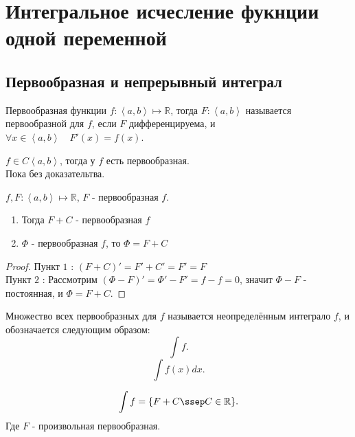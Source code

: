 \documentclass[11pt, oneside]{article}   	%
\begin{document}
\section{Интегральное исчесление фукнции одной переменной}
    \subsection{Первообразная и непрерывный интеграл}
         \begin{definition}
             Первообразная функции $f : \left<a, b\right> \mapsto \mathbb{R}$, тогда $F : \left<a, b\right> $ называется первообразной для $f$, если $F$ дифференцируема, и $\forall{x\in \left<a, b\right>}\quad F'(x) = f(x)$.
         \end{definition}
         \begin{theorem}
             $f\in C\left<a, b\right>$, тогда у $f$ есть первообразная.\\
             Пока без доказательтва.
         \end{theorem}
         \begin{theorem}
             $f,F: \left<a, b\right> \mapsto \mathbb{R}$, $F$ -  первообразная $f$.\\
             \begin{enumerate}
                 \item Тогда $F+C$ - первообразная $f$ 
                 \item $\Phi$ -  первообразная $f$, то $\Phi = F + C$
             \end{enumerate}
             \begin{proof}
                 Пункт $1$ : $(F+C)' = F'+C' = F' = F$ \\
                 Пункт $2$ : Рассмотрим $(\Phi - F)' = \Phi' - F' = f - f =0$, значит $\Phi - F$ - постоянная, и $\Phi = F + C$.
             \end{proof}
         \end{theorem}
         \begin{definition}
             Множество всех первообразных для $f$ называется неопределённым интеграло $f$, и обозначается следующим образом:
             \[ \int f .\]
             \[ \int f(x)dx.\] 
         \end{definition}
         \begin{dlemma}
             \[ \int f = \{F+C \ssep C\in \mathbb{R}\}  .\]
             Где $F$ - произвольная первообразная.
         \end{dlemma}
\end{document}
